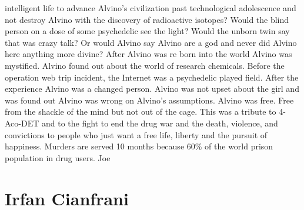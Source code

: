 \documentclass[12pt]{book}
\begin{document}
intelligent life to advance Alvino's civilization past technological adolescence and not destroy Alvino with the discovery of radioactive isotopes? Would the blind person on a dose of some psychedelic see the light? Would the unborn twin say that was crazy talk? Or would Alvino say Alvino are a god and never did Alvino here anything more divine? After Alvino was re born into the world Alvino was mystified. Alvino found out about the world of research chemicals. Before the operation web trip incident, the Internet was a psychedelic played field. After the experience Alvino was a changed person. Alvino was not upset about the girl and was found out Alvino was wrong on Alvino's assumptions. Alvino was free. Free from the shackle of the mind but not out of the cage. This was a tribute to 4-Aco-DET and to the fight to end the drug war and the death, violence, and convictions to people who just want a free life, liberty and the pursuit of happiness. Murders are served 10 months because 60\% of the world prison population in drug users. Joe



\chapter{Irfan Cianfrani}
\end{document}
